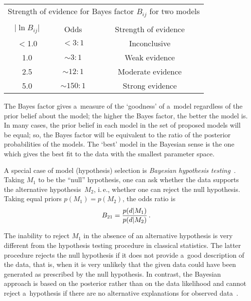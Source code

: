 \begin{multicols}{2}
\vspace*{3pt}

{\small
  \begin{center}


\begin{tabular}{ccc}
\multicolumn{3}{c}{Strength of evidence for Bayes factor $B_{ij}$ for two models}\\
&&\\[-6pt]
\hline
  $\vert \ln B_{ij}\vert$&Odds&Strength of evidence\\
  \hline
  $<$1.0\hphantom{$<$}&$< 3 : 1$&Inconclusive\\
  1.0&$\sim 3 : 1$&Weak evidence\\
  2.5&$\sim 12 : 1$\hphantom{9}&Moderate evidence\\
  5.0&$\sim150 : 1$\hphantom{99}&Strong evidence\\
  \hline
  \end{tabular}
  \end{center}}

  \vspace*{12pt}


\noindent


  The Bayes factor gives a~measure of the `goodness' of a~model regardless of the
prior belief about the model; the higher the Bayes factor, the better the model is. In
many cases, the prior belief in each model in the set of proposed models will be
equal; so, the Bayes factor will be equivalent to the ratio of the posterior probabilities
of the models. The `best' model in the Bayesian sense is the one which gives the best
fit to the data with the smallest parameter space.

  A special case of model (hypothesis) selection is \textit{Bayesian hypothesis
testing}~\cite{27-kl, 33-kl}. Taking $M_1$ to be the ``null'' hypothesis, one can ask
whether the data supports the alternative hypothesis~$M_2$, i.\,e., whether one
can reject the null hypothesis. Taking equal priors $p(M_1) = p(M_2)$, the odds
ratio is
  $$
  B_{21} =\displaystyle\frac{\displaystyle p(d\vert M_1)\mathstrut}{\displaystyle p(d\vert M_2)\mathstrut}\,.
  $$

  The inability to reject $M_1$ in the absence of an alternative hypothesis is very different from the hypothesis testing procedure in classical statistics. The latter procedure rejects the null hypothesis if it does not provide a~good description of the data, that is, when it is very unlikely that the given data could have been generated as
prescribed by the null hypothesis. In contrast, the Bayesian approach is
based on the posterior rather than on the data likelihood
and cannot reject a~hypothesis if there are no alternative
explanations for observed data~\cite{27-kl}.


\end{multicols}
